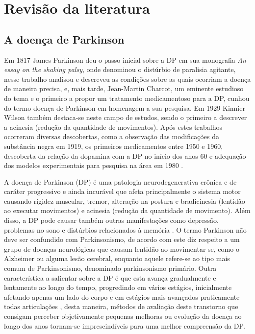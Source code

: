 \documentclass[
	12pt,				%
	openany,			%
	oneside,			%
	a4paper,			%
	english,			%
	french,				%
	spanish,			%
	brazil				%
	]{abntex2}
\begin{document}
\chapter{Revisão da literatura}

\section{A doença de Parkinson}
Em 1817 James Parkinson deu o passo inicial sobre a DP em sua monografia \textit{An essay on the shaking palsy}, onde denominou o distúrbio de paralisia agitante, nesse trabalho analisou e descreveu as condições sobre as quais ocorriam a doença de maneira precisa, e, mais tarde, Jean-Martin Charcot, um eminente estudioso do tema e o primeiro a propor um tratamento medicamentoso para a DP, cunhou do termo doença de Parkinson em homenagem a sua pesquisa. Em 1929 Kinnier Wilson também destaca-se neste campo de estudos, sendo o primeiro a descrever a acinesia (redução da quantidade de movimentos). Após estes trabalhos ocorreram diversas descobertas, como a observação das modificações da substância negra em 1919, os primeiros medicamentos entre 1950 e 1960, descoberta da relação da dopamina com a DP no início dos anos 60 e adequação dos modelos experimentais para pesquisa na área em 1980 \cite{limongi2001,ebook2016}.

A doença de Parkinson (DP) é uma patologia neurodegenerativa crônica e de caráter progressivo e ainda incurável que afeta principalmente o sistema motor causando rigidez muscular, tremor, alteração na postura e bradicinesia (lentidão ao executar movimentos) e acinesia (redução da quantidade de movimento). Além disso, a DP pode causar também outras manifestações como depressão, problemas no sono e distúrbios relacionados à memória \cite{limongi2001}. O termo Parkinson não deve ser confundido com Parkinsonismo, de acordo com  este diz respeito a um grupo de doenças neurológicas que causam lentidão ao movimentar-se, como o Alzheimer ou alguma lesão cerebral, enquanto aquele refere-se ao tipo mais comum de Parkinsonismo, denominado parkinsonismo primário. Outra característica a salientar sobre a DP é que esta avança gradualmente e lentamente ao longo do tempo, progredindo em vários estágios, inicialmente afetando apenas um lado do corpo e em estágios mais avançados praticamente todas articulações \cite{rawar2015}, desta maneira, métodos de avaliação deste transtorno que consigam perceber objetivamente pequenas melhoras ou evolução da doença ao longo dos anos tornam-se imprescindíveis para uma melhor compreensão da DP.
\end{document}
